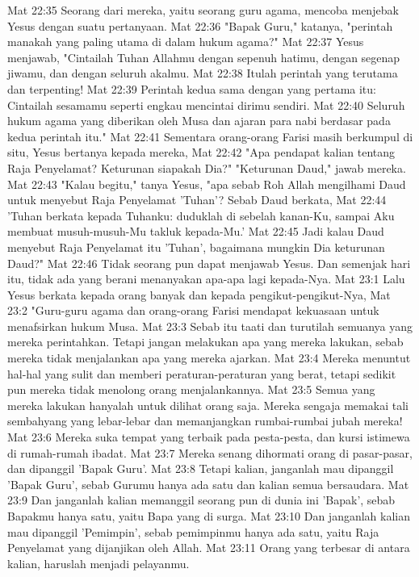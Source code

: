 Mat 22:35  Seorang dari mereka, yaitu seorang guru agama, mencoba menjebak Yesus dengan suatu pertanyaan.
Mat 22:36  "Bapak Guru," katanya, "perintah manakah yang paling utama di dalam hukum agama?"
Mat 22:37  Yesus menjawab, "Cintailah Tuhan Allahmu dengan sepenuh hatimu, dengan segenap jiwamu, dan dengan seluruh akalmu.
Mat 22:38  Itulah perintah yang terutama dan terpenting!
Mat 22:39  Perintah kedua sama dengan yang pertama itu: Cintailah sesamamu seperti engkau mencintai dirimu sendiri.
Mat 22:40  Seluruh hukum agama yang diberikan oleh Musa dan ajaran para nabi berdasar pada kedua perintah itu."
Mat 22:41  Sementara orang-orang Farisi masih berkumpul di situ, Yesus bertanya kepada mereka,
Mat 22:42  "Apa pendapat kalian tentang Raja Penyelamat? Keturunan siapakah Dia?" "Keturunan Daud," jawab mereka.
Mat 22:43  "Kalau begitu," tanya Yesus, "apa sebab Roh Allah mengilhami Daud untuk menyebut Raja Penyelamat 'Tuhan'? Sebab Daud berkata,
Mat 22:44  'Tuhan berkata kepada Tuhanku: duduklah di sebelah kanan-Ku, sampai Aku membuat musuh-musuh-Mu takluk kepada-Mu.'
Mat 22:45  Jadi kalau Daud menyebut Raja Penyelamat itu 'Tuhan', bagaimana mungkin Dia keturunan Daud?"
Mat 22:46  Tidak seorang pun dapat menjawab Yesus. Dan semenjak hari itu, tidak ada yang berani menanyakan apa-apa lagi kepada-Nya.
Mat 23:1  Lalu Yesus berkata kepada orang banyak dan kepada pengikut-pengikut-Nya,
Mat 23:2  "Guru-guru agama dan orang-orang Farisi mendapat kekuasaan untuk menafsirkan hukum Musa.
Mat 23:3  Sebab itu taati dan turutilah semuanya yang mereka perintahkan. Tetapi jangan melakukan apa yang mereka lakukan, sebab mereka tidak menjalankan apa yang mereka ajarkan.
Mat 23:4  Mereka menuntut hal-hal yang sulit dan memberi peraturan-peraturan yang berat, tetapi sedikit pun mereka tidak menolong orang menjalankannya.
Mat 23:5  Semua yang mereka lakukan hanyalah untuk dilihat orang saja. Mereka sengaja memakai tali sembahyang yang lebar-lebar dan memanjangkan rumbai-rumbai jubah mereka!
Mat 23:6  Mereka suka tempat yang terbaik pada pesta-pesta, dan kursi istimewa di rumah-rumah ibadat.
Mat 23:7  Mereka senang dihormati orang di pasar-pasar, dan dipanggil 'Bapak Guru'.
Mat 23:8  Tetapi kalian, janganlah mau dipanggil 'Bapak Guru', sebab Gurumu hanya ada satu dan kalian semua bersaudara.
Mat 23:9  Dan janganlah kalian memanggil seorang pun di dunia ini 'Bapak', sebab Bapakmu hanya satu, yaitu Bapa yang di surga.
Mat 23:10  Dan janganlah kalian mau dipanggil 'Pemimpin', sebab pemimpinmu hanya ada satu, yaitu Raja Penyelamat yang dijanjikan oleh Allah.
Mat 23:11  Orang yang terbesar di antara kalian, haruslah menjadi pelayanmu.
